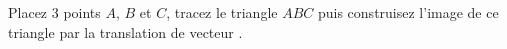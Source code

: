 \exercice Placez 3 points $A$, $B$ et $C$, tracez le triangle $ABC$ puis construisez l'image de ce triangle par la translation de vecteur .